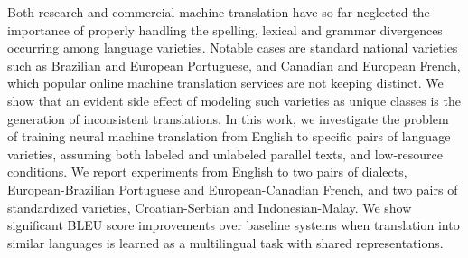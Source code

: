 Both research and commercial machine translation have so far neglected the importance of properly handling the spelling, lexical and grammar divergences occurring among language varieties. Notable cases are standard national varieties such as Brazilian and European Portuguese, and Canadian and European French, which popular online machine translation services are not keeping distinct. We show that an evident side effect of modeling such varieties as unique classes is the generation of inconsistent translations. In this work, we investigate the problem of training neural machine translation from English to specific pairs of language varieties, assuming both labeled and unlabeled parallel texts, and low-resource conditions. We report experiments from English to two pairs of dialects, European-Brazilian Portuguese and European-Canadian French, and two pairs of standardized varieties, Croatian-Serbian and Indonesian-Malay. We show significant BLEU score improvements over baseline systems when translation into similar languages is learned as a multilingual task with shared representations.
